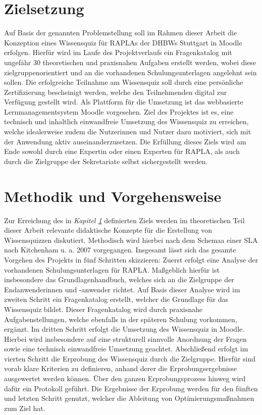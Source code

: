 \section{Zielsetzung}\label{sec:zielsetzung}
Auf Basis der genannten Problemstellung soll im Rahmen dieser Arbeit
die Konzeption eines Wissensquiz für \acp{RAPLA} der \acp{DHBW}
Stuttgart in Moodle erfolgen.
Hierfür wird im Laufe des Projektverlaufs ein Fragenkatalog mit ungefähr 30
theoretischen und praxisnahen Aufgaben erstellt werden, wobei diese zielgruppenorientiert
und an die vorhandenen Schulungsunterlagen angelehnt sein sollen.
Die erfolgreiche Teilnahme am Wissensquiz soll durch eine persönliche Zertifizierung
bescheinigt werden, welche den Teilnehmenden digital zur Verfügung gestellt wird.
Als Plattform für die Umsetzung ist das webbasierte Lernmanagementsystem Moodle
vorgesehen.
Ziel des Projektes ist es, eine technisch und inhaltlich einwandfreie Umsetzung
des Wissensquiz zu erreichen, welche idealerweise
zudem die Nutzerinnen und Nutzer dazu motiviert, sich mit der Anwendung aktiv
auseinanderzusetzen.
Die Erfüllung dieses Ziels wird am Ende sowohl durch eine Expertin oder einen
Experten für \ac{RAPLA}, als auch durch die Zielgruppe der Sekretariate selbst
sichergestellt werden.
\section{Methodik und Vorgehensweise}
Zur Erreichung des in \textit{Kapitel \ref{sec:zielsetzung}} definierten Ziels werden
im theoretischen Teil dieser Arbeit relevante didaktische Konzepte für die Erstellung von Wissensquizzen
diskutiert. Methodisch wird hierbei nach dem Schemaa einer \ac{SLA} nach Kitchenham u. a. 2007 vorgegangen.
Insgesamt lässt sich das gesamte Vorgehen des Projekts in fünf Schritten skizzieren:
Zuerst erfolgt eine Analyse der vorhandenen Schulungsunterlagen für \ac{RAPLA}.
Maßgeblich hierfür ist insbesondere das Grundlagenhandbuch, welches sich an die Zielgruppe der
Endanwenderinnen und -anwender richtet. Auf Basis dieser Analyse wird im zweiten Schritt
ein Fragenkatalog erstellt, welcher die Grundlage für das Wissensquiz bildet.
Dieser Fragenkatalog wird durch praxisnahe Aufgabenstellungen, welche ebenfalls
in der späteren Schulung vorkommen, ergänzt. Im dritten Schritt erfolgt die Umsetzung
des Wissensquiz in Moodle. Hierbei wird insbesondere auf eine strukturell
sinnvolle Anordnung der Fragen sowie eine technisch einwandfreie Umsetzung geachtet.
Abschließend erfolgt im vierten Schritt die Erprobung des Wissensquiz durch die Zielgruppe.
Hierfür sind vorab klare Kriterien zu definieren, anhand derer die Erprobungsergebnisse
ausgewertet werden können. Über den ganzen Erprobungsprozess hinweg wird dafür
ein Protokoll geführt. Die Ergebnisse der Erprobung werden für den fünften
und letzten Schritt genutzt, welcher die Ableitung von Optimierungsmaßnahmen
zum Ziel hat.
